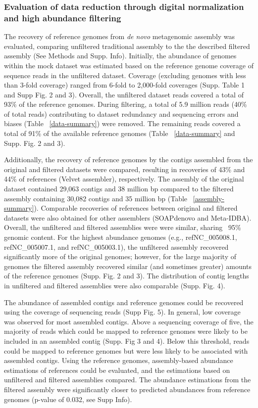 \documentclass[11pt]{article} %
\begin{document}
\subsubsection{Evaluation of data reduction through digital normalization 
and high abundance filtering}

The recovery of reference genomes from {\em de novo} metagenomic assembly
was evaluated, comparing unfiltered traditional assembly to the the
described filtered assembly (See Methods and Supp. Info). Initially,
the abundance of genomes within the mock dataset was estimated based
on the reference genome coverage of sequence reads in the unfiltered
dataset.  Coverage (excluding genomes with less than 3-fold coverage)
ranged from 6-fold to 2,000-fold coverages (Supp. Table
1 and Supp Fig. 2 and 3).  Overall, the unfiltered dataset reads covered a
total of 93\% of the reference genomes.  During filtering, a total of
5.9 million reads (40\% of total reads) contributing to dataset
redundancy and sequencing errors and biases (Table ~\ref{data-summary}) 
were removed.  The remaining reads covered a total of 91\% of the available 
reference genomes (Table ~\ref{data-summary} and Supp. Fig. 2 and 3).

Additionally, the recovery of reference genomes by the contigs
assembled from the original and filtered datasets were compared,
resulting in recoveries of 43\% and 44\% of references (Velvet
assembler), respectively.  The assembly of the original dataset
contained 29,063 contigs and 38 million bp compared to the filtered
assembly containing 30,082 contigs and 35 million bp (Table
~\ref{assembly-summary}).  Comparable recoveries of references between
original and filtered datasets were also obtained for other assemblers
(SOAPdenovo and Meta-IDBA).  Overall, the unfiltered and filtered
assemblies were were similar, sharing ~95\% genomic content.  For the
highest abundance genomes (e.g., ref\textbar{}NC\_005008.1,
ref\textbar{}NC\_005007.1, and ref\textbar{}NC\_005003.1), the
unfiltered assembly recovered significantly more of the original
genomes; however, for the large majority of genomes the filtered
assembly recovered similar (and sometimes greater) amounts of the
reference genomes (Supp. Fig. 2 and 3).  The distribution of contig
lengths in unfiltered and filtered assemblies were also comparable
(Supp. Fig. 4).

The abundance of assembled contigs and reference genomes could be
recovered using the coverage of sequencing reads (Supp Fig. 5).  In
general, low coverage was observed for most assembled contigs. Above a sequencing coverage of five, the majority of reads
which could be mapped to reference genomes were likely to be included
in an assembled contig (Supp. Fig 3 and 4).  Below this threshold,
reads could be mapped to reference genomes but were less likely to be
associated with assembled contigs.  Using the reference genomes,
assembly-based abundance estimations of references could be evaluated,
and the estimations based on unfiltered and filtered assemblies
compared.  The abundance estimations from the filtered assembly were
significantly closer to predicted abundances from reference genomes
(p-value of 0.032, see Supp Info).
\end{document}

